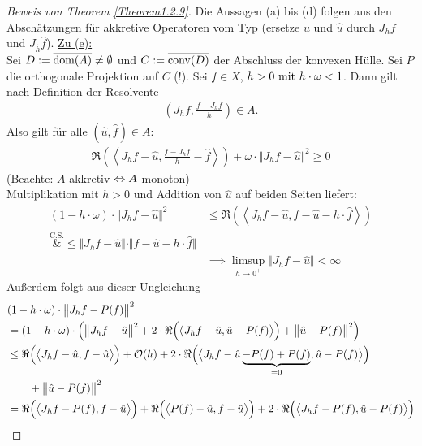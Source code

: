 \begin{proof}[Beweis von Theorem \ref{Theorem1.2.9}]\enter
	Die Aussagen (a) bis (d) folgen aus den Abschätzungen für akkretive Operatoren vom Typ 
	(ersetze $u$ und $\hat{u}$ durch $J_hf$ und $J_{\hat{h}}\hat{f}$).\nl
	\underline{Zu (e):}\\
	Sei $D:=\overline{\dom(A)}\neq\emptyset$  und $C:=\overline{\conv(D)}$ der Abschluss der konvexen Hülle. 
	Sei $P$ die orthogonale Projektion  auf $C$ (!). Sei $f\in X$, $h>0\mit h\cdot\omega<1$. 
	Dann gilt nach Definition der Resolvente
	\begin{align*}
		\left( J_h f,\frac{f-J_h f}{h}\right)\in A.
	\end{align*}
	Also gilt für alle $(\hat{u},\hat{f})\in A$:
	\begin{align*}
		\Re\left(\left\langle J_h f-\hat{u},\frac{f-J_h f}{h}-\hat{f}\right\rangle\right)+\omega\cdot\big\Vert J_h f-\hat{u}\big\Vert^2\geq0
	\end{align*}
	(Beachte: $A$ akkretiv $\gdw A$ monoton)\\
	Multiplikation mit $h>0$ und Addition von $\hat{u}$ auf beiden Seiten  liefert:
	\begin{align*}
		(1-h\cdot\omega)\cdot\big\Vert J_h f-\hat{u}\big\Vert^2
		&\leq
		\Re\left(\left\langle J_h f-\hat{u},f-\hat{u}-h\cdot \hat{f}\right\rangle\right)\\
		\overset{\text{C.S.}}&{\leq}
		\big\Vert J_h f-\hat{u}\big\Vert\cdot\Vert f-\hat{u}-h\cdot\hat{f}\big\Vert\\
		&\implies
		\limsup\limits_{h\to 0^+}\big\Vert J_h f-\hat{u}\big\Vert<\infty
	\end{align*}
	Außerdem folgt aus dieser Ungleichung
	\begin{align*}
		&(1-h\cdot\omega)\cdot\big\Vert J_h f- P(f)\big\Vert^2\\
		&=(1-h\cdot\omega)\cdot\left(\big\Vert J_h f-\hat{u}\big\Vert^2+2\cdot\Re\Big(\big\langle J_h f-\hat{u},\hat{u}-P(f)\big\rangle\Big)+\big\Vert\hat{u}-P(f)\big\Vert^2\right)\\
		&\leq
		\Re\Big(\big\langle J_h f-\hat{u},f-\hat{u}\big\rangle\Big)+\O(h)
		+2\cdot\Re\Big(\big\langle J_h f-\hat{u}\underbrace{-P(f)+P(f)}_{=0},\hat{u}-P(f)\big\rangle\Big)\\
		&\qquad+\big\Vert\hat{u}-P(f)\big\Vert^2\\
		&=
		\Re\Big(\big\langle J_h f-P(f),f-\hat{u}\big\rangle\Big)
		+\Re\Big(\big\langle P(f)-\hat{u},f-\hat{u}\big\rangle\Big)
		+2\cdot\Re\Big(\big\langle J_h f-P(f),\hat{u}-P(f)\big\rangle\Big)\\

\end{align*}
\end{proof}

